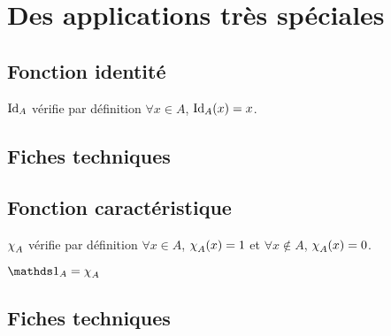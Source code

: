 \documentclass[12pt,a4paper]{article}
\begin{document}
\section{Des applications très spéciales}

\subsection{Fonction identité}

\begin{latexex}
$\operatorname*{\operatorname{Id}}_A$ vérifie par définition
$\forall x \in A$, $\operatorname*{\operatorname{Id}}_A(x) = x$.
\end{latexex}




\subsection{Fiches techniques}





\subsection{Fonction caractéristique}


\begin{latexex}
$\operatorname{\chi}_A$ vérifie par définition
$\forall x \in A$, $\operatorname{\chi}_A(x) = 1$ et
$\forall x \notin A$, $\operatorname{\chi}_A(x) = 0$.
\end{latexex}





\begin{latexex}
$\caractone_A = \caract_A$
\end{latexex}




\subsection{Fiches techniques}


    
\end{document}
